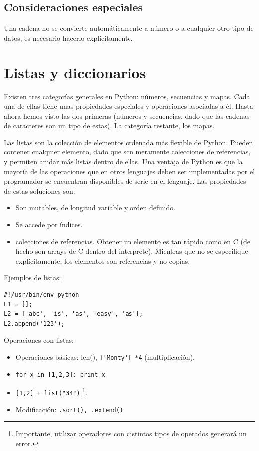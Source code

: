 \documentclass[12pt]{article} %
\begin{document}
\subsection{Consideraciones especiales}
Una cadena no se convierte automáticamente a número o a cualquier otro tipo de datos, es necesario hacerlo explícitamente.

\section{Listas y diccionarios}
Existen tres categorías generales en Python: números, secuencias y mapas. Cada una de ellas tiene unas propiedades especiales y operaciones asociadas a él. Hasta ahora hemos visto las dos primeras (números y secuencias, dado que las cadenas de caracteres son un tipo de estas). La categoría restante, los mapas.

Las listas son la colección de elementos ordenada más flexible de Python. Pueden contener cualquier elemento, dado que son meramente colecciones de referencias, y permiten anidar más listas dentro de ellas.
Una ventaja de Python es que la mayoría de las operaciones que en otros lenguajes deben ser implementadas por el programador se encuentran disponibles de serie en el lenguaje.
Las propiedades de estas soluciones son:
\begin{itemize}
	\item Son mutables, de longitud variable y orden definido.
	\item Se accede por índices.
	\item colecciones de referencias. Obtener un elemento es tan rápido como en C (de hecho son arrays de C dentro del intérprete). Mientras que no se especifique explícitamente, los elementos son referencias y no copias.
\end{itemize}
Ejemplos de listas:
\begin{lstlisting}[frame=single, showspaces=false]
#!/usr/bin/env python
L1 = [];
L2 = ['abc', 'is', 'as', 'easy', 'as'];
L2.append('123');
\end{lstlisting}
Operaciones con listas:
\begin{itemize}
	\item Operaciones básicas: len(), \verb+['Monty'] *4+ (multiplicación).
	\item \verb+for x in [1,2,3]: print x+
	\item \verb#[1,2] + list("34")# \footnote{Importante, utilizar operadores con distintos tipos de operados generará un error.}.
	\item Modificación: \verb+.sort(), .extend()+
\end{itemize}
\end{document}
